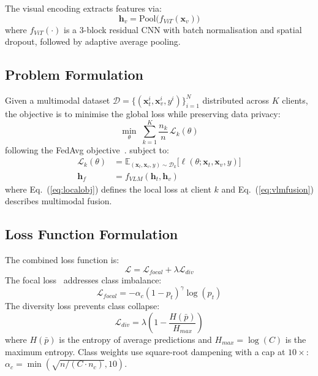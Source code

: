 \documentclass[conference]{IEEEtran}
\begin{document}
The visual encoding extracts features via:
\begin{equation}
  \mathbf{h}_v = \mathrm{Pool}\!\bigl(f_{ViT}(\mathbf{x}_v)\bigr)
  \label{eq:visenc}
\end{equation}
where $f_{ViT}(\cdot)$ is a 3-block residual CNN with batch normalisation and spatial
dropout, followed by adaptive average pooling.

\subsection{Problem Formulation}

Given a multimodal dataset $\mathcal{D} = \{(\mathbf{x}_t^i, \mathbf{x}_v^i,
y^i)\}_{i=1}^{N}$ distributed across $K$ clients, the objective is to minimise the
global loss while preserving data privacy:
\begin{equation}
  \min_{\theta}\; \sum_{k=1}^{K} \frac{n_k}{n}\,\mathcal{L}_k(\theta)
  \label{eq:fedobj}
\end{equation}
following the FedAvg objective~\cite{McMahan2017}.
subject to:
\begin{align}
  \mathcal{L}_k(\theta) &= \mathbb{E}_{(\mathbf{x}_t,\mathbf{x}_v,y)\sim\mathcal{D}_k}
    \bigl[\ell(\theta;\mathbf{x}_t,\mathbf{x}_v,y)\bigr] \label{eq:localobj}\\
  \mathbf{h}_f &= f_{VLM}(\mathbf{h}_t, \mathbf{h}_v) \label{eq:vlmfusion}
\end{align}
where Eq.~(\ref{eq:localobj}) defines the local loss at client $k$ and
Eq.~(\ref{eq:vlmfusion}) describes multimodal fusion.

\subsection{Loss Function Formulation}

The combined loss function is:
\begin{equation}
  \mathcal{L} = \mathcal{L}_{focal} + \lambda\mathcal{L}_{div}
  \label{eq:loss}
\end{equation}
The focal loss~\cite{Lin2017} addresses class imbalance:
\begin{equation}
  \mathcal{L}_{focal} = -\alpha_c(1-p_t)^{\gamma}\log(p_t)
  \label{eq:focal}
\end{equation}
The diversity loss prevents class collapse:
\begin{equation}
  \mathcal{L}_{div} = \lambda\!\left(1 - \frac{H(\bar{p})}{H_{max}}\right)
  \label{eq:div}
\end{equation}
where $H(\bar{p})$ is the entropy of average predictions and $H_{max}=\log(C)$ is the
maximum entropy. Class weights use square-root dampening with a cap at $10\times$:
$\alpha_c = \min(\sqrt{n/({C \cdot n_c})}, 10)$.
\end{document}
